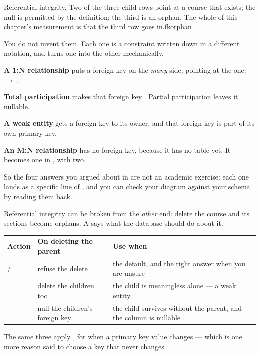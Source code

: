 {Referential integrity. Two of the three child rows point at a course that
exists; the null is permitted by the definition; the third is an orphan. The
whole of this chapter's measurement is that the third row goes in.}{fkorphan}

\begin{conceptbox}
You do not invent them. Each one is a  constraint written
down in a different notation, and  turns one into the other
mechanically.

\begin{tight}
  \item \textbf{A 1:N relationship} puts a foreign key on the \emph{many} side,
        pointing at the one.  $\rightarrow$
        .
  \item \textbf{Total participation} makes that foreign key .
        Partial participation leaves it nullable.
  \item \textbf{A weak entity} gets a foreign key to its owner, and that
        foreign key is part of its own primary key.
  \item \textbf{An M:N relationship} has no foreign key, because it has no
        table yet. It becomes one in , with two.
\end{tight}

\smallskip
So the four answers you argued about in  are not an
academic exercise: each one lands as a specific line of ,
and you can check your diagram against your schema by reading them back.
\end{conceptbox}

\begin{definitionbox}
Referential integrity can be broken from the \emph{other} end: delete the
course and its sections become orphans. A  says what
the database should do about it.

\medskip
\begin{tabular}{@{}L{3.1cm}L{5.0cm}L{5.9cm}@{}}
\textbf{Action} & \textbf{On deleting the parent} & \textbf{Use when} \\
 /  & refuse the delete & the default, and
  the right answer when you are unsure \\
 & delete the children too & the child is meaningless alone ---
  a weak entity \\
 & null the children's foreign key & the child survives
  without the parent, and the column is nullable \\
\end{tabular}

\smallskip
The same three apply , for when a primary key value changes
--- which is one more reason  said to choose a key that never
changes.
\end{definitionbox}

